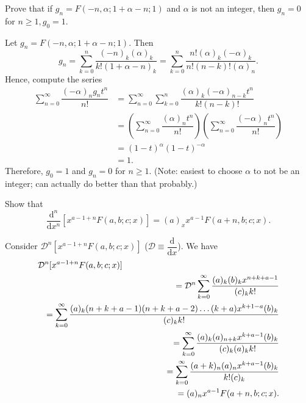 \begin{problem} \label{problem7chapter4}
Prove that if $g_n = F(-n, \alpha; 1 +\alpha-n; 1)$ and $\alpha$ is not an integer, then $g_n=0$ for $n \geq 1, g_0=1$.
\end{problem}
\begin{solution}
Let $g_n = F(-n,\alpha;1+\alpha-n;1).$
Then
$$g_n = \displaystyle\sum_{k=0}^n \dfrac{(-n)_k (\alpha)_k}{k! (1+\alpha-n)_k} = \displaystyle\sum_{k=0}^n \dfrac{n! (\alpha)_k (-\alpha)_k}{n! (n-k)! (\alpha)_n}.$$
Hence, compute the series
$$\begin{array}{ll}
\displaystyle\sum_{n=0}^{\infty} \dfrac{(-\alpha)_n g_n t^n}{n!} &= \displaystyle\sum_{n=0}^{\infty} \displaystyle\sum_{k=0}^n \dfrac{(\alpha)_k (-\alpha)_{n-k} t^n}{k! (n-k)!} \\
&= \left( \displaystyle\sum_{n=0}^{\infty} \dfrac{(\alpha)_n t^n}{n!} \right) \left( \displaystyle\sum_{n=0}^{\infty} \dfrac{(-\alpha)_n t^n}{n!} \right) \\
&= (1-t)^{\alpha} (1-t)^{-\alpha} \\
&= 1.
\end{array}$$
Therefore, $g_0=1$ and $g_n=0$ for $n \geq 1$.
(Note: easiest to choose $\alpha$ to not be an integer; can actually do better than that probably.)
\end{solution}
\begin{problem}\label{problem8chapter4}
Show that
$$\dfrac{\mathrm{d}^n}{\mathrm{d}x^n} \left[ x^{a-1+n} F(a,b;c;x) \right] = (a)_x x^{a-1} F(a+n, b; c; x).$$
\end{problem}
\begin{solution}
Consider $\mathcal{D}^n[x^{a-1+n}F(a,b;c;x)]$ ($\mathcal{D} \equiv \dfrac{\mathrm{d}}{\mathrm{d}x}$).
We have
\begin{eqnarray*}
\lefteqn{\mathcal{D}^n[x^{a-1+n}F(a,b;c;x)]} \\
& &= \mathcal{D}^n \displaystyle\sum_{k=0}^{\infty} \dfrac{(a)_k (b)_k x^{n+k+a-1}}{(c)_k k!} \\
& &= \displaystyle\sum_{k=0}^{\infty} \dfrac{(a)_k (n+k+a-1)(n+k+a-2) \ldots (k+a) x^{k+1-a} (b)_k}{(c)_k k!} \\
& &= \displaystyle\sum_{k=0}^{\infty} \dfrac{(a)_k (a)_{n+k} x^{k+a-1}(b)_k}{(c)_k (a)_k k!} \\
& &= \displaystyle\sum_{k=0}^{\infty} \dfrac{(a+k)_n (a)_n x^{k+a-1} (b)_k}{k! (c)_k} \\
& &= (a)_n x^{a-1} F(a+n,b;c;x).
\end{eqnarray*}
\end{solution}
